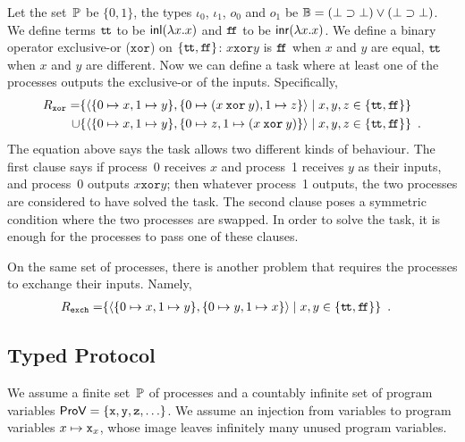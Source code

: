 \newcommand{\true}{\texttt{t\kern -1.2pt t}}
\newcommand{\false}{\texttt{f\kern -1.7pt f}}
\newcommand{\xor}{\mathbin{\mathtt{xor}}}
 \begin{example}
  \label{ex:xor}
  Let the set~$\mathbb{P}$ be $\{0,1\}$,
  the types $\iota_0$, $\iota_1$, $o_0$ and $o_1$ be
  $\mathbb{B} = (\bot\supset\bot)\lor(\bot\supset\bot)$.
  We define terms
  $\true$ to be $\mathsf{inl}({\lambda x.x})$ and
  $\false$ to be $\mathsf{inr}({\lambda x.x})$.
  We define a binary operator exclusive-or ($\mathtt{xor}$) on
  $\{\true,\false\}$:
  $x \xor y$ is $\false$ when $x$ and $y$ are equal, $\true$ when $x$
  and $y$ are different.
  Now we can define a task where at least one of the processes outputs
  the exclusive-or of the inputs.  Specifically,
  \begin{align*}
   R_{\mathtt{xor}} =&
   \{\tuple{\{0\mapsto x, 1\mapsto y\},\{0\mapsto (x\xor y), 1\mapsto z\}}\mid
   x,y,z\in\{\true,\false\}\}
   \\ \cup & \{\tuple{\{0\mapsto x, 1\mapsto y\},\{0\mapsto z, 1\mapsto
   (x \xor y)\}}\mid
   x,y,z\in\{\true,\false\}\}\enspace.
  \end{align*}
  The equation above says the task allows two different kinds of
  behaviour.  The first clause says if process~0 receives $x$ and
  process~1 receives $y$ as their inputs, and process~0 outputs $x\xor
  y$; then whatever process~1 outputs, the two processes are considered
  to have solved the task.  The second clause poses a symmetric
  condition where the two processes are swapped.
  In order to solve the task,
  it is enough for the processes to pass one of these clauses.
 \end{example}
  \begin{example}
   \label{ex:exchange}
   On the same set of processes, there is another problem that requires
   the processes to exchange their inputs.  Namely,
  \begin{align*}
   R_{\mathtt{exch}} =&
   \{\tuple{\{0\mapsto x, 1\mapsto y\},\{0\mapsto y, 1\mapsto x\}}\mid
   x,y\in\{\true,\false\}\}\enspace.
  \end{align*}
  \end{example}

\subsection{Typed Protocol}

We assume a finite set~$\mathbb{P}$
of processes and a countably infinite
set of program variables $\mathsf{ProV} =\{\texttt{x}, \texttt{y}, \texttt{z}, \ldots\}$.
We assume an injection from variables to program variables $x\mapsto
\texttt{x}_x$, whose image leaves infinitely many unused program variables.

